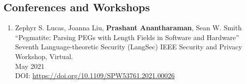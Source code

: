 \documentclass[letterpaper,10pt]{article}
\begin{document}
\subsection*{\color{dartmouthgreen} Conferences and Workshops} %

\begin{enumerate}[label={C\arabic*.}]
\setlength\itemsep{0ex}

\item Zephyr S. Lucas, Joanna Liu, {\bf Prashant Anantharaman}, Sean W. Smith \\
  ``Pegmatite: Parsing PEGs with Length Fields in Software and Hardware''\\
  Seventh Language-theoretic Security (LangSec) IEEE Security and Privacy Workshop, Virtual.\\
  May 2021\\
  DOI: \url{https://doi.org/10.1109/SPW53761.2021.00026}


\end{enumerate}
\end{document}

